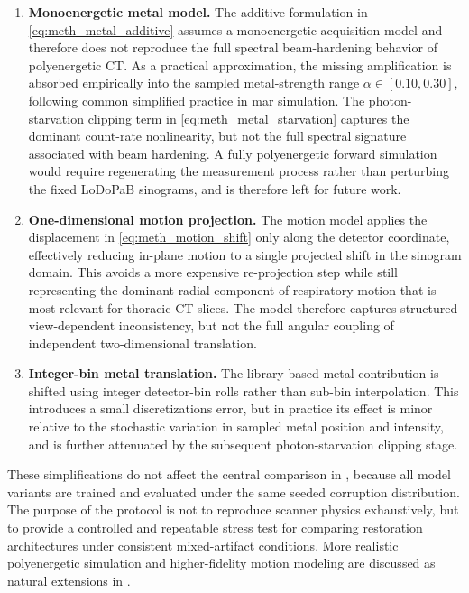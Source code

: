 \begin{enumerate}
    \item \textbf{Monoenergetic metal model.}
    The additive formulation in \eqref{eq:meth_metal_additive} assumes a monoenergetic acquisition model and therefore does not reproduce the full spectral beam-hardening behavior of polyenergetic CT. As a practical approximation, the missing amplification is absorbed empirically into the sampled metal-strength range $\alpha \in [0.10, 0.30]$, following common simplified practice in \gls{mar} simulation. The photon-starvation clipping term in \eqref{eq:meth_metal_starvation} captures the dominant count-rate nonlinearity, but not the full spectral signature associated with beam hardening. A fully polyenergetic forward simulation would require regenerating the measurement process rather than perturbing the fixed LoDoPaB sinograms, and is therefore left for future work.

    \item \textbf{One-dimensional motion projection.}
    The motion model applies the displacement in \eqref{eq:meth_motion_shift} only along the detector coordinate, effectively reducing in-plane motion to a single projected shift in the sinogram domain. This avoids a more expensive re-projection step while still representing the dominant radial component of respiratory motion that is most relevant for thoracic CT slices. The model therefore captures structured view-dependent inconsistency, but not the full angular coupling of independent two-dimensional translation.

    \item \textbf{Integer-bin metal translation.}
    The library-based metal contribution is shifted using integer detector-bin rolls rather than sub-bin interpolation. This introduces a small discretizations error, but in practice its effect is minor relative to the stochastic variation in sampled metal position and intensity, and is further attenuated by the subsequent photon-starvation clipping stage.
\end{enumerate}

These simplifications do not affect the central comparison in , because all model variants are trained and evaluated under the same seeded corruption distribution. The purpose of the protocol is not to reproduce scanner physics exhaustively, but to provide a controlled and repeatable stress test for comparing restoration architectures under consistent mixed-artifact conditions. More realistic polyenergetic simulation and higher-fidelity motion modeling are discussed as natural extensions in .
